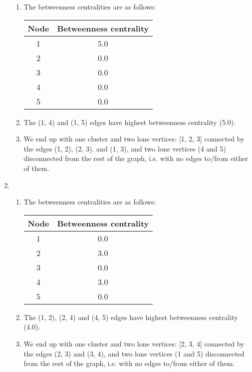 \documentclass[12pt]{article}
\begin{document}
\begin{enumerate}
\begin{enumerate}
        \item The betweenness centralities are as follows:\\
            \begin{tabular}{|c|c|}
                \hline
                \textbf{Node} & \textbf{Betweenness centrality}\\
                \hline
                1 & 5.0 \\
                2 & 0.0 \\
                3 & 0.0 \\
                4 & 0.0 \\
                5 & 0.0 \\
                \hline
            \end{tabular}
        \item The (1, 4) and (1, 5) edges have highest betweenness centrality (5.0).
        \item We end up with one cluster and two lone vertices: [1, 2, 3] connected by the edges (1, 2), (2, 3), and (1, 3), and two lone vertices (4 and 5) disconnected from the rest of the graph, i.e. with no edges to/from either of them.
    \end{enumerate}
    \item \begin{enumerate}
        \item The betweenness centralities are as follows:\\
            \begin{tabular}{|c|c|}
                \hline
                \textbf{Node} & \textbf{Betweenness centrality}\\
                \hline
                1 & 0.0 \\
                2 & 3.0 \\
                3 & 0.0 \\
                4 & 3.0 \\
                5 & 0.0 \\
                \hline
            \end{tabular}
        \item The (1, 2), (2, 4) and (4, 5) edges have highest betweenness centrality (4.0).
        \item We end up with one cluster and two lone vertices: [2, 3, 4] connected by the edges (2, 3) and (3, 4), and two lone vertices (1 and 5) disconnected from the rest of the graph, i.e. with no edges to/from either of them.
    \end{enumerate}

\end{enumerate}
\end{document}
